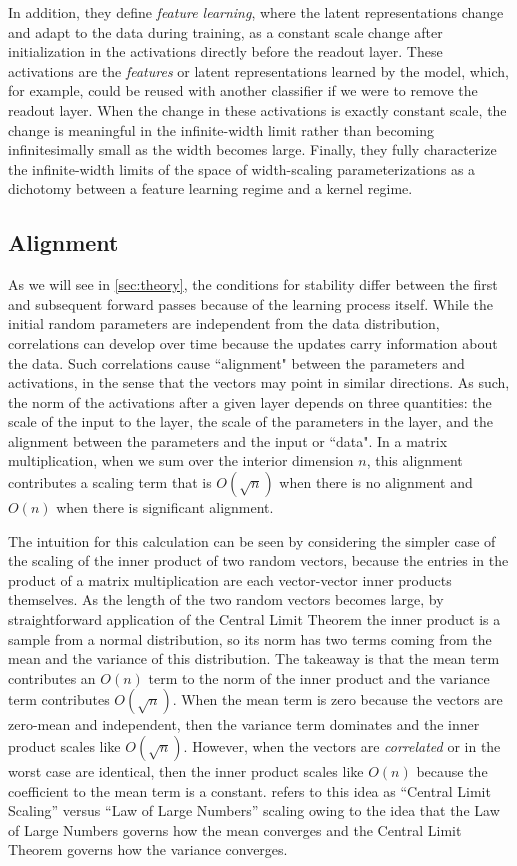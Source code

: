 \documentclass{article}
\theoremstyle{plain}
\theoremstyle{definition}
\theoremstyle{remark}
\begin{document}
In addition, they define \emph{feature learning}, where the latent representations change and adapt to the data during training, as a constant scale change after initialization in the activations directly before the readout layer. These activations are the \emph{features} or latent representations learned by the model, which, for example, could be reused with another classifier if we were to remove the readout layer. When the change in these activations is exactly constant scale, the change is meaningful in the infinite-width limit rather than becoming infinitesimally small as the width becomes large. Finally, they fully characterize the infinite-width limits of the space of width-scaling parameterizations as a dichotomy between a feature learning regime and a kernel regime.


\subsection{Alignment}\label{alignment}
As we will see in \cref{sec:theory}, the conditions for stability differ between the first and subsequent forward passes because of the learning process itself. While the initial random parameters are independent from the data distribution, correlations can develop over time because the updates carry information about the data. Such correlations cause ``alignment" between the parameters and activations, in the sense that the vectors may point in similar directions. As such, the norm of the activations after a given layer depends on three quantities: the scale of the input to the layer, the scale of the parameters in the layer, and the alignment between the parameters and the input or ``data". In a matrix multiplication, when we sum over the interior dimension $n$, this alignment contributes a scaling term that is $O(\sqrt{n})$ when there is no alignment and $O(n)$ when there is significant alignment.

The intuition for this calculation can be seen by considering the simpler case of the scaling of the inner product of two random vectors, because the entries in the product of a matrix multiplication are each vector-vector inner products themselves. As the length of the two random vectors becomes large, by straightforward application of the Central Limit Theorem the inner product is a sample from a normal distribution, so its norm has two terms coming from the mean and the variance of this distribution. The takeaway is that the mean term contributes an $O(n)$ term to the norm of the inner product and the variance term contributes $O(\sqrt{n})$. When the mean term is zero because the vectors are zero-mean and independent, then the variance term dominates and the inner product scales like $O(\sqrt{n})$. However, when the vectors are \emph{correlated} or in the worst case are identical, then the inner product scales like $O(n)$ because the coefficient to the mean term is a constant. \citet{yang2021tensoriv} refers to this idea as ``Central Limit Scaling'' versus ``Law of Large Numbers'' scaling owing to the idea that the Law of Large Numbers governs how the mean converges and the Central Limit Theorem governs how the variance converges.
\end{document}
